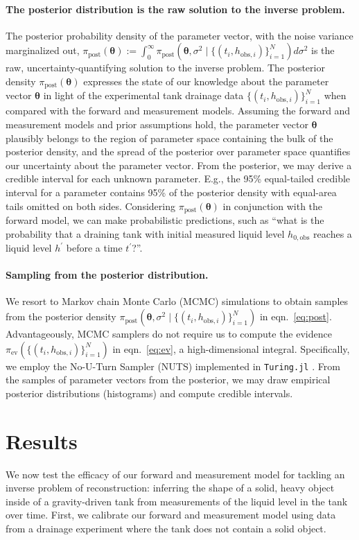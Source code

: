 \documentclass[openacc]{rsproca_new}%
\newcommand\thedata {$\{(t_i,h_{\text{obs}, i})\}_{i=1}^{N}$\xspace}
\newcommand\thedatanomath {\{(t_i,h_{\text{obs}, i})\}_{i=1}^{N}}
\begin{document}
\paragraph{The posterior distribution is the raw solution to the inverse problem.}
The posterior probability density of the parameter vector, with the noise variance marginalized out, $\pi_{\text{post}}(\boldsymbol\theta):= \int_0^\infty \pi_{\text{post}}(\boldsymbol \theta, \sigma^2 \mid \thedatanomath) d\sigma^2$ is the raw, uncertainty-quantifying solution to the inverse problem.
The posterior density $\pi_{\text{post}}(\boldsymbol\theta)$ expresses the state of our knowledge about the parameter vector $\boldsymbol \theta$ in light of the experimental tank drainage data \thedata when compared with the forward and measurement models. Assuming the forward and measurement models and prior assumptions hold, the parameter vector $\boldsymbol \theta$ plausibly belongs to the region of parameter space containing the bulk of the posterior density, and the spread of the posterior over parameter space quantifies our uncertainty about the parameter vector. 
From the posterior, we may derive a credible interval for each unknown parameter. E.g., the 95\% equal-tailed credible interval for a parameter contains 95\% of the posterior density with equal-area tails omitted on both sides. 
Considering $\pi_{\text{post}}(\boldsymbol\theta)$ in conjunction with the forward model, we can make probabilistic predictions, such as ``what is the probability that a draining tank with initial measured liquid level $h_{0, \text{obs}}$ reaches a liquid level $h^\prime$ before a time $t^\prime$?''.

\paragraph{Sampling from the posterior distribution.} We resort to Markov chain Monte Carlo (MCMC) simulations to obtain samples from the posterior density $\pi_{\text{post}}(\boldsymbol \theta, \sigma^2 \mid \thedatanomath)$ in eqn.~\ref{eq:post}. Advantageously, MCMC samplers do not require us to compute the evidence $\pi_{\text{ev}}(\thedatanomath)$ in eqn.~\ref{eq:ev}, a high-dimensional integral. Specifically, we employ the No-U-Turn Sampler (NUTS) \cite{hoffman2014no} implemented in \texttt{Turing.jl} \cite{ge2018turing}. From the samples of parameter vectors from the posterior, we may draw empirical posterior distributions (histograms) and compute credible intervals.


\section{Results}
We now test the efficacy of our forward and measurement model for tackling an inverse problem of reconstruction: inferring the shape of a solid, heavy object inside of a gravity-driven tank from measurements of the liquid level in the tank over time. 
First, we calibrate our forward and measurement model using data from a drainage experiment where the tank does not contain a solid object.
\end{document}
